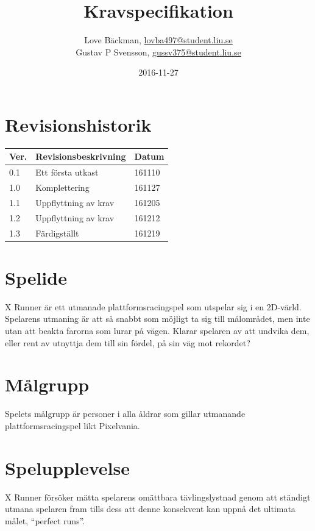 \documentclass{TDP003mall}
\author{Love Bäckman, \url{lovba497@student.liu.se} \\
  Gustav P Svensson, \url{gussv375@student.liu.se}}
\title{Kravspecifikation}
\date{2016-11-27}
\begin{document}
\projectpage

\tableofcontents
\newpage

\section{Revisionshistorik}
\begin{table}[!h]
\begin{tabularx}{\linewidth}{|l|X|l|}
\hline
Ver. & Revisionsbeskrivning & Datum \\\hline
0.1 & Ett första utkast & 161110 \\\hline
1.0 & Komplettering & 161127 \\\hline
1.1 & Uppflyttning av krav & 161205 \\\hline
1.2 & Uppflyttning av krav & 161212 \\\hline
1.3 & Färdigställt & 161219 \\\hline
\end{tabularx}
\end{table}


\section{Spelide}
X Runner är ett utmanade plattformsracingspel som utspelar sig i en 2D-värld.
Spelarens utmaning är att så snabbt som möjligt ta sig till målområdet, men inte utan att beakta farorna som lurar på vägen. Klarar spelaren av att undvika dem, eller rent av utnyttja dem till sin fördel, på sin väg mot rekordet?

\section{Målgrupp}
Spelets målgrupp är personer i alla åldrar som gillar utmanande plattformsracingspel likt Pixelvania.

\section{Spelupplevelse}
X Runner försöker mätta spelarens omättbara tävlingslystnad genom att ständigt utmana spelaren fram tills dess att denne konsekvent kan uppnå det ultimata målet, ``perfect runs''.
\end{document}
